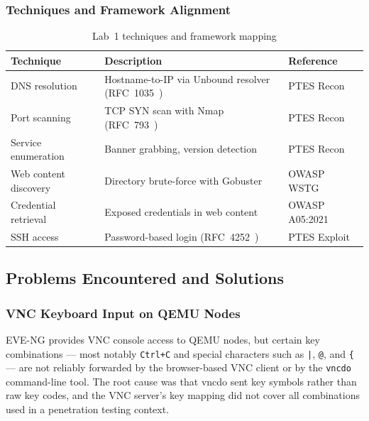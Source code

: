 \subsubsection*{Techniques and Framework Alignment}

\begin{table}[H]
\centering
\small
\begin{tabularx}{\textwidth}{lXl}
\toprule
\textbf{Technique} & \textbf{Description} & \textbf{Reference} \\
\midrule
DNS resolution        & Hostname-to-IP via Unbound resolver (RFC~1035~\cite{rfc1035}) & PTES Recon  \\
Port scanning         & TCP SYN scan with Nmap (RFC~793~\cite{rfc793})                & PTES Recon  \\
Service enumeration   & Banner grabbing, version detection                            & PTES Recon  \\
Web content discovery & Directory brute-force with Gobuster                           & OWASP WSTG  \\
Credential retrieval  & Exposed credentials in web content                            & OWASP A05:2021\\
SSH access            & Password-based login (RFC~4252~\cite{rfc4252})                & PTES Exploit\\
\bottomrule
\end{tabularx}
\caption{Lab~1 techniques and framework mapping}
\label{tab:lab1-techniques}
\end{table}

\subsection{Problems Encountered and Solutions}

\subsubsection{VNC Keyboard Input on QEMU Nodes}

EVE-NG provides VNC console access to QEMU nodes, but certain key combinations ---
most notably \texttt{Ctrl+C} and special characters such as \texttt{|}, \texttt{@},
and \texttt{\{} --- are not reliably forwarded by the browser-based VNC client or by
the \texttt{vncdo} command-line tool. The root cause was that vncdo sent key symbols
rather than raw key codes, and the VNC server's key mapping did not cover all
combinations used in a penetration testing context.

